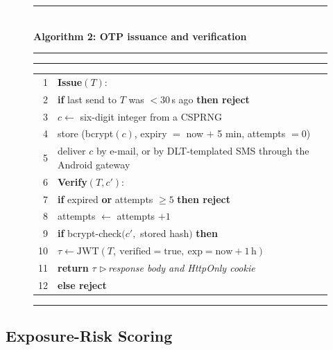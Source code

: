 \documentclass[10pt,twocolumn]{article}
\makeatletter
\newcommand{\algtop}[1]{\noindent\rule{\columnwidth}{0.6pt}\\[1pt]{\footnotesize\textbf{#1}}\\[-1pt]\rule{\columnwidth}{0.4pt}}
\newcommand{\algmid}{\noindent\rule{\columnwidth}{0.4pt}}
\newcommand{\algbot}{\noindent\rule{\columnwidth}{0.6pt}}
\newcommand{\cmt}[1]{\hfill$\triangleright$\,\textit{#1}}
\newcommand{\algtab}[1]{\par\vspace{1pt}\noindent\begin{tabular}{@{}r@{\hspace{5pt}}p{0.9\columnwidth}@{}}#1\end{tabular}\par}
\makeatother
\begin{document}
\begin{figure}[!t]
\algtop{Algorithm 2: OTP issuance and verification}
\par\vspace{1pt}
\algmid
{\footnotesize
\algtab{
1 & \textbf{Issue}$(T)$:\\
2 & \hspace{1em}\textbf{if} last send to $T$ was $<30$\,s ago \textbf{then reject}\\
3 & \hspace{1em}$c \leftarrow$ six-digit integer from a CSPRNG\\
4 & \hspace{1em}store (bcrypt$(c)$, expiry $=$ now $+$ 5 min, attempts $=0$)\\
5 & \hspace{1em}deliver $c$ by e-mail, or by DLT-templated SMS through the Android gateway\\
6 & \textbf{Verify}$(T,c')$:\\
7 & \hspace{1em}\textbf{if} expired \textbf{or} attempts $\ge 5$ \textbf{then reject}\\
8 & \hspace{1em}attempts $\leftarrow$ attempts $+1$\\
9 & \hspace{1em}\textbf{if} bcrypt-check$(c',$ stored hash$)$ \textbf{then}\\
10 & \hspace{2em}$\tau \leftarrow \mathrm{JWT}(T,\ \mathrm{verified}=\text{true},\ \mathrm{exp}=\text{now}+1\,\text{h})$\\
11 & \hspace{2em}\textbf{return} $\tau$ \cmt{response body and HttpOnly cookie}\\
12 & \hspace{1em}\textbf{else reject}}}
\algbot
\end{figure}

\subsection{Exposure-Risk Scoring}
\end{document}
